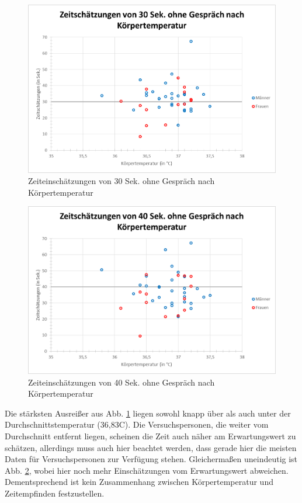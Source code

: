 \documentclass{Paper}
\begin{document}



\begin{figure}[H]
	\centering
	\includegraphics[scale=0.7]{../Diagramme/scatterPre/30ohne_koerpertemperatur.png}
	\caption{Zeiteinschätzungen von 30 Sek. ohne Gespräch nach Körpertemperatur}
	\label{img:temp30ohne}
\end{figure}
\begin{figure}[H]
	\centering
	\includegraphics[scale=0.7]{../Diagramme/scatterPre/40ohne_koerpertemperatur.png}
	\caption{Zeiteinschätzungen von 40 Sek. ohne Gespräch nach Körpertemperatur}
	\label{img:temp40ohne}
\end{figure}
 
Die stärksten Ausreißer aus Abb. \ref{img:temp30ohne} liegen sowohl knapp über als auch unter der Durchschnittstemperatur (36,83\textdegree C). Die Versuchspersonen, die weiter vom Durchschnitt entfernt liegen, scheinen die Zeit auch näher am Erwartungswert zu schätzen, allerdings muss auch hier beachtet werden, dass gerade hier die meisten Daten für Versuchspersonen zur Verfügung stehen. 
Gleichermaßen uneindeutig ist Abb. \ref{img:temp40ohne}, wobei hier noch mehr Einschätzungen vom Erwartungswert abweichen. 	
Dementsprechend ist kein Zusammenhang zwischen Körpertemperatur und Zeitempfinden festzustellen. 
\end{document}
